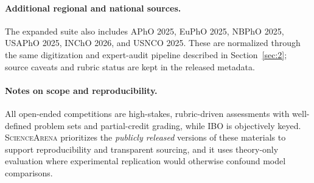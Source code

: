 \documentclass[11pt]{article}
\begin{document}
\paragraph{Additional regional and national sources.}
The expanded suite also includes APhO 2025, EuPhO 2025, NBPhO 2025, USAPhO 2025, INChO 2026, and USNCO 2025. These are normalized through the same digitization and expert-audit pipeline described in Section~\ref{sec:2}; source caveats and rubric status are kept in the released metadata.

\paragraph{Notes on scope and reproducibility.}
All open-ended competitions are high-stakes, rubric-driven assessments with well-defined problem sets and partial-credit grading, while IBO is objectively keyed. \textsc{ScienceArena} prioritizes the \emph{publicly released} versions of these materials to support reproducibility and transparent sourcing, and it uses theory-only evaluation where experimental replication would otherwise confound model comparisons.



% 


\end{document}
